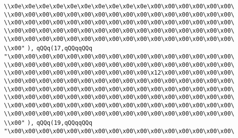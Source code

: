 \verb|\\x0e\x0e\x0e\x0e\x0e\x0e\x0e\x0e\x0e\x0e\x00\x00\x00\x00\x00\x00\|\newline
\verb|\\x00\x00\x00\x00\x00\x00\x00\x00\x00\x00\x00\x00\x00\x00\x00\x00\|\newline
\verb|\\x00\x00\x00\x00\x00\x00\x00\x00\x00\x00\x00\x00\x00\x00\x00\x00\|\newline
\verb|\\x00\x00\x00\x00\x00\x00\x00\x00\x00\x00\x00\x00\x00\x00\x00\x00\|\newline
\verb|\\x00\x00\x00\x00\x00\x00\x00\x00\x00\x00\x00\x00\x00\x00\x00\x00\|\newline
\verb|\\x00"|\newline
\verb|),|\newline
\verb|qQQq(17,qQQqqQQq|\newline
\verb|"\x00\x00\x00\x00\x00\x00\x00\x00\x00\x00\x00\x00\x00\x00\x00\x00\|\newline
\verb|\\x00\x00\x00\x00\x00\x00\x00\x00\x00\x00\x00\x00\x00\x00\x00\x00\|\newline
\verb|\\x00\x00\x00\x00\x00\x00\x00\x00\x00\x00\x12\x00\x00\x00\x00\x00\|\newline
\verb|\\x00\x00\x00\x00\x00\x00\x00\x00\x00\x00\x00\x00\x00\x00\x00\x00\|\newline
\verb|\\x00\x00\x00\x00\x00\x00\x00\x00\x00\x00\x00\x00\x00\x00\x00\x00\|\newline
\verb|\\x00\x00\x00\x00\x00\x00\x00\x00\x00\x00\x00\x00\x00\x00\x00\x00\|\newline
\verb|\\x00\x00\x00\x00\x00\x00\x00\x00\x00\x00\x00\x00\x00\x00\x00\x00\|\newline
\verb|\\x00\x00\x00\x00\x00\x00\x00\x00\x00\x00\x00\x00\x00\x00\x00\x00\|\newline
\verb|\\x00"|\newline
\verb|),|\newline
\verb|qQQq(19,qQQqqQQq|\newline
\verb|"\x00\x00\x00\x00\x00\x00\x00\x00\x00\x00\x00\x00\x00\x00\x00\x00\|\newline
